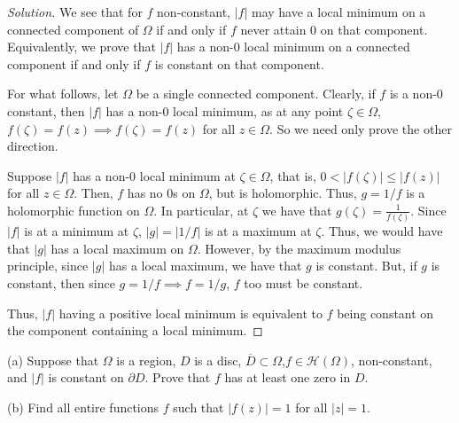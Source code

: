 \documentclass[10pt]{article}
\newenvironment{problem}[2][]{\begin{trivlist}
\item[\hskip \labelsep {\bfseries #1}\hskip \labelsep {\bfseries #2.}]}{\end{trivlist}}
\begin{document}
\begin{proof}[Solution]

We see that for $f$ non-constant, $|f|$ may have a local minimum on a  connected component of $\Omega$ if and only if $f$ never attain 0 on that component. Equivalently, we prove that $|f|$ has a non-0 local minimum on a connected component if and only if $f$ is constant on that component.

For what follows, let $\Omega$ be a single connected component. Clearly, if $f$ is a non-0 constant, then $|f|$ has a non-0 local minimum, as at any point $\zeta \in \Omega$, $f(\zeta) = f(z) \implies f(\zeta) = f(z)$ for all $z \in \Omega$. So we need only prove the other direction.

Suppose $|f|$ has a non-0 local minimum at $\zeta \in \Omega$, that is, $0 < |f(\zeta)| \leq |f(z)|$ for all $z \in \Omega$. Then, $f$ has no 0s on $\Omega$, but is holomorphic. Thus, $g = 1/f$ is a holomorphic function on $\Omega$. In particular, at $\zeta$ we have that $ g(\zeta) = \frac{1}{f(\zeta)}$. Since $|f|$ is at a minimum at $\zeta$, $|g| = |1/f|$ is at a maximum at $\zeta$. Thus, we would have that $|g|$ has a local maximum on $\Omega$. However, by the maximum modulus principle, since $|g|$ has a local maximum, we have that $g$ is constant. But, if $g$ is constant, then since $g = 1/f \implies f = 1/g$, $f$ too must be constant.

Thus, $|f|$ having a positive local minimum is equivalent to $f$ being constant on the component containing a local minimum.

\end{proof}
  

\begin{problem}{Question 5}

(a) Suppose that $\Omega$ is a region, $D$ is a disc, $\overline{D} \subset \Omega$,$f \in \mathcal{H}(\Omega)$, non-constant, and $|f|$ is constant on $\partial D$. Prove that $f$ has at least one zero in $D$. 

(b) Find all entire functions $f$ such that $|f(z)|  =1 $ for all $|z| = 1$. 

\end{problem}
\end{document}
